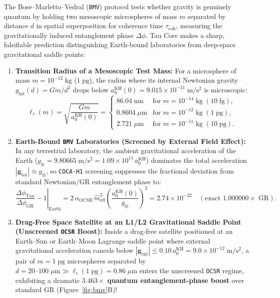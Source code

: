 \documentclass[11pt,a4paper]{article}
\begin{document}
The Bose--Marletto--Vedral (\texttt{BMV}) protocol tests whether gravity is genuinely quantum by holding two mesoscopic microspheres of mass $m$ separated by distance $d$ in spatial superposition for coherence time $\tau_{\mathrm{coh}}$, measuring the gravitationally induced entanglement phase $\Delta\phi$. Tau Core makes a sharp, falsifiable prediction distinguishing Earth-bound laboratories from deep-space gravitational saddle points:
\begin{enumerate}[label=(\arabic*),leftmargin=1.8em,itemsep=2pt]
\item \textbf{Transition Radius of a Mesoscopic Test Mass:} For a microsphere of mass $m = 10^{-12}\;\mathrm{kg}$ ($1\;\mathrm{pg}$), the radius where its internal Newtonian gravity $g_{\mathrm{int}}(d)=Gm/d^2$ drops below $a_0^{\mathrm{KH}}(0)=9.015\times 10^{-11}\;\mathrm{m/s^2}$ is microscopic:
\begin{equation}
\ell_\tau(m) = \sqrt{\frac{Gm}{a_0^{\mathrm{KH}}(0)}} =
\begin{cases}
86.04\;\mathrm{nm} & \text{for } m = 10^{-14}\;\mathrm{kg}\;(10\;\mathrm{fg}),\\
0.8604\;\mu\mathrm{m} & \text{for } m = 10^{-12}\;\mathrm{kg}\;(1\;\mathrm{pg}),\\
2.721\;\mu\mathrm{m} & \text{for } m = 10^{-11}\;\mathrm{kg}\;(10\;\mathrm{pg}).
\end{cases}
\label{eq:bmv-ell-tau}
\end{equation}
\item \textbf{Earth-Bound \texttt{BMV} Laboratories (Screened by External Field Effect):} In any terrestrial laboratory, the ambient gravitational acceleration of the Earth ($g_\oplus = 9.80665\;\mathrm{m/s^2} = 1.09\times 10^{11}\,a_0^{\mathrm{KH}}$) dominates the total acceleration $|\mathbf{g}_{\mathrm{tot}}|\approx g_\oplus$, so \texttt{COCA-H1} screening suppresses the fractional deviation from standard Newtonian/GR entanglement phase to:
\begin{equation}
\left.\frac{\Delta\phi_{\mathrm{Tau}}}{\Delta\phi_{\mathrm{GR}}} - 1\right|_{\mathrm{Earth}} = 2\,\alpha_{\mathrm{OCSR}}\,\hat{m}_{\mathrm{eff}}^2\!\left(\frac{a_0^{\mathrm{KH}}(0)}{g_\oplus}\right)^{\!2} = 2.74\times 10^{-22}\quad(\text{exact $1.000000\times$ GR}).
\end{equation}
\item \textbf{Drag-Free Space Satellite at an L1/L2 Gravitational Saddle Point (Unscreened \texttt{OCSR} Boost):} Inside a drag-free satellite positioned at an Earth--Sun or Earth--Moon Lagrange saddle point where external gravitational acceleration cancels below $|\mathbf{g}_{\mathrm{ext}}|\le 0.10\,a_0^{\mathrm{KH}} = 9.0\times 10^{-12}\;\mathrm{m/s^2}$, a pair of $m=1\;\mathrm{pg}$ microspheres separated by $d = 20\text{--}100\;\mu\mathrm{m} \gg \ell_\tau(1\;\mathrm{pg})=0.86\;\mu\mathrm{m}$ enters the unscreened \texttt{OCSR} regime, exhibiting a dramatic $\mathbf{3.463\times}$ \textbf{quantum entanglement-phase boost} over standard GR (Figure~\ref{fig:bmv}B)!
\end{enumerate}
\end{document}
